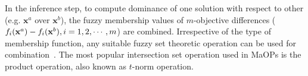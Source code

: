\documentclass[review]{elsarticle}
\makeatletter
\newcommand{\thickhline}{%
	\noalign {\ifnum 0=`}\fi \hrule height 1pt
	\futurelet \reserved@a \@xhline
}
\makeatother
\begin{document}


In the inference step, to compute dominance of one solution with respect to other (e.g. $\textbf{x}^a$ over $\textbf{x}^b$), the fuzzy membership values of $m$-objective differences ($f_i({\bf x}^a)-f_i({\bf x}^b), i=1,2,\cdots,m$) are combined.                                                                                                                                                                 Irrespective of the type of membership function, any suitable fuzzy set theoretic operation can be used for 
combination~\citep{mendel1995fuzzy}. %
The most popular intersection set operation used in MaOPs is the product operation, also known as $t$-norm operation. 
\end{document}
